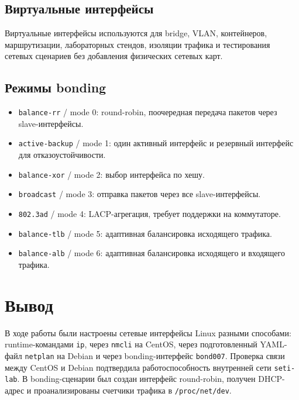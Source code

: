 \documentclass[a4paper,12pt]{article}
\begin{document}
\subsection{Виртуальные интерфейсы}

Виртуальные интерфейсы используются для bridge, VLAN, контейнеров, маршрутизации, лабораторных стендов, изоляции трафика и тестирования сетевых сценариев без добавления физических сетевых карт.

\subsection{Режимы bonding}

\begin{itemize}
  \item \texttt{balance-rr} / mode 0: round-robin, поочередная передача пакетов через slave-интерфейсы.
  \item \texttt{active-backup} / mode 1: один активный интерфейс и резервный интерфейс для отказоустойчивости.
  \item \texttt{balance-xor} / mode 2: выбор интерфейса по хешу.
  \item \texttt{broadcast} / mode 3: отправка пакетов через все slave-интерфейсы.
  \item \texttt{802.3ad} / mode 4: LACP-агрегация, требует поддержки на коммутаторе.
  \item \texttt{balance-tlb} / mode 5: адаптивная балансировка исходящего трафика.
  \item \texttt{balance-alb} / mode 6: адаптивная балансировка исходящего и входящего трафика.
\end{itemize}

\section{Вывод}

В ходе работы были настроены сетевые интерфейсы Linux разными способами: runtime-командами \texttt{ip}, через \texttt{nmcli} на CentOS, через подготовленный YAML-файл \texttt{netplan} на Debian и через bonding-интерфейс \texttt{bond007}. Проверка связи между CentOS и Debian подтвердила работоспособность внутренней сети \texttt{seti-lab}. В bonding-сценарии был создан интерфейс round-robin, получен DHCP-адрес и проанализированы счетчики трафика в \texttt{/proc/net/dev}.
\end{document}
